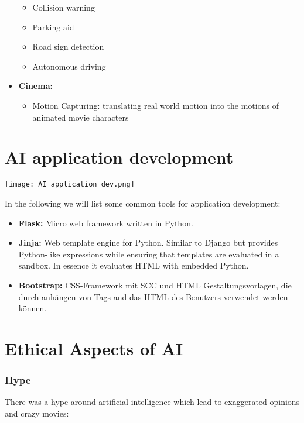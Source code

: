 \begin{itemize}
          \begin{itemize}
              \item Collision warning
              \item Parking aid
              \item Road sign detection
              \item Autonomous driving
          \end{itemize}
    \item \textbf{Cinema:}
          \begin{itemize}
              \item Motion Capturing: translating real world motion into the motions of animated movie characters
          \end{itemize}
\end{itemize}

\section{AI application development}

\texttt{[image: AI\_application\_dev.png]}

In the following we will list some common tools for application development:

\begin{itemize}
    \item \textbf{Flask:} Micro web framework written in Python.
    \item \textbf{Jinja:} Web template engine for Python. Similar to Django but provides Python-like expressions while ensuring that templates are evaluated in a sandbox. In essence it evaluates HTML with embedded Python.
    \item \textbf{Bootstrap:} CSS-Framework mit SCC und HTML Gestaltungsvorlagen, die durch anhängen von Tags and das HTML des Benutzers verwendet werden können.
\end{itemize}

\section{Ethical Aspects of AI}

\subsubsection*{Hype}

There was a hype around artificial intelligence which lead to exaggerated opinions and crazy movies:

